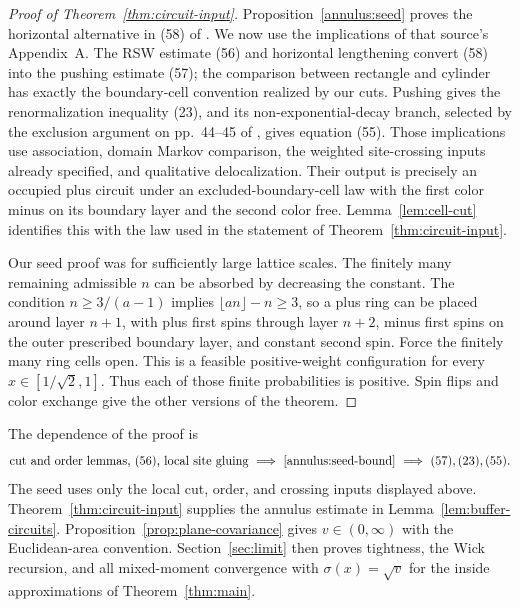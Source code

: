 \begin{proof}[Proof of Theorem~\ref{thm:circuit-input}]
Proposition~\ref{annulus:seed} proves the horizontal alternative in
(58) of \cite{GL2025}.  We now use the implications of that source's
Appendix~A.  The RSW estimate (56) and horizontal lengthening convert
(58) into the pushing estimate (57); the comparison between rectangle
and cylinder has exactly the boundary-cell convention realized by our
cuts.  Pushing gives the renormalization inequality (23), and its
non-exponential-decay branch, selected by the exclusion argument on
pp.~44--45 of \cite{GL2025}, gives equation (55).  Those implications
use association, domain Markov comparison, the weighted site-crossing
inputs already specified, and qualitative delocalization.  Their output is precisely
an occupied plus circuit under an excluded-boundary-cell law with the
first color minus on its boundary layer and the second color free.
Lemma~\ref{lem:cell-cut} identifies this with the law used in the
statement of Theorem~\ref{thm:circuit-input}.

Our seed proof was for sufficiently large lattice scales.  The finitely
many remaining admissible $n$ can be absorbed by decreasing the
constant.  The condition $n\geq3/(a-1)$ implies
$\lfloor an\rfloor-n\geq3$, so a plus ring can be placed around layer
$n+1$, with plus first spins through layer $n+2$, minus first spins on
the outer prescribed boundary layer, and constant second spin.  Force
the finitely many ring cells open.  This is a feasible positive-weight
configuration for every $x\in[1/\sqrt2,1]$.  Thus each of those finite
probabilities is positive.  Spin flips and color exchange give the
other versions of the theorem.
\end{proof}

The dependence of the proof is
\[
 \text{cut and order lemmas, (56), local site gluing}
 \ \Longrightarrow\ \eqref{annulus:seed-bound}
 \ \Longrightarrow\ (57),(23),(55).
\]
The seed uses only the local cut, order, and crossing inputs displayed
above.  Theorem~\ref{thm:circuit-input} supplies the annulus estimate
in Lemma~\ref{lem:buffer-circuits}.
Proposition~\ref{prop:plane-covariance} gives $v\in(0,\infty)$ with
the Euclidean-area convention.  Section~\ref{sec:limit} then proves
tightness, the Wick recursion, and all mixed-moment convergence with
$\sigma(x)=\sqrt v$ for the inside approximations of
Theorem~\ref{thm:main}.
